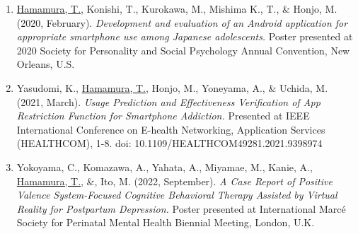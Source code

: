 \documentclass{article}
\begin{document}
\begin{enumerate}
	\item \underline{Hamamura, T.}, Konishi, T., Kurokawa, M., Mishima K., T., \& Honjo, M. (2020, February). \textit{Development and evaluation of an Android application for appropriate smartphone use among Japanese adolescents.} Poster presented at 2020 Society for Personality and Social Psychology Annual Convention, New Orleans, U.S.
	\item Yasudomi, K., \underline{Hamamura, T.}, Honjo, M., Yoneyama, A., \& Uchida, M. (2021, March). \textit{Usage Prediction and Effectiveness Verification of App Restriction Function for Smartphone Addiction.} Presented at IEEE International Conference on E-health Networking, Application Services (HEALTHCOM), 1-8. doi: 10.1109/HEALTHCOM49281.2021.9398974
	\item Yokoyama, C., Komazawa, A., Yahata, A., Miyamae, M., Kanie, A., \underline{Hamamura, T.}, \&, Ito, M. (2022, September). \textit{A Case Report of Positive Valence System-Focused Cognitive Behavioral Therapy Assisted by Virtual Reality for Postpartum Depression.} Poster presented at International Marc\'e Society for Perinatal Mental Health Biennial Meeting, London, U.K.
\end{enumerate}
\end{document}

